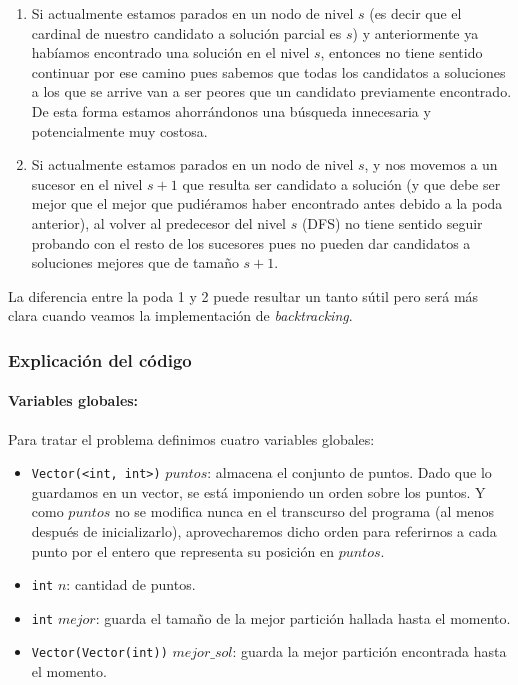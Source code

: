 \begin{enumerate}
  \item Si actualmente estamos parados en un nodo de nivel $s$ (es decir que el cardinal de nuestro candidato a solución parcial es $s$) y anteriormente ya habíamos encontrado una solución en el nivel $s$, entonces no tiene sentido continuar por ese camino pues sabemos que todas los candidatos a soluciones a los que se arrive van a ser peores que un candidato previamente encontrado. De esta forma estamos ahorrándonos una búsqueda innecesaria y potencialmente muy costosa.
  \item Si actualmente estamos parados en un nodo de nivel $s$, y nos movemos a un sucesor en el nivel $s+1$ que resulta ser candidato a solución (y que debe ser mejor que el mejor que pudiéramos haber encontrado antes debido a la poda anterior), al volver al predecesor del nivel $s$ (DFS) no tiene sentido seguir probando con el resto de los sucesores pues no pueden dar candidatos a soluciones mejores que de tamaño $s+1$.
\end{enumerate}

La diferencia entre la poda 1 y 2 puede resultar un tanto sútil pero será más clara cuando veamos la implementación de \textit{backtracking}.

\subsubsection{Explicación del código}
  \paragraph{Variables globales:} Para tratar el problema definimos cuatro variables globales:
  \begin{itemize}
    \item \texttt{Vector(<int, int>)} $puntos$: almacena el conjunto de puntos. Dado que lo guardamos en un vector, se está imponiendo un orden sobre los puntos. Y como $puntos$ no se modifica nunca en el transcurso del programa (al menos después de inicializarlo), aprovecharemos dicho orden para referirnos a cada punto por el entero que representa su posición en $puntos$.
    \item \texttt{int} $n$: cantidad de puntos.
    \item \texttt{int} $mejor$: guarda el tamaño de la mejor partición hallada hasta el momento.
    \item \texttt{Vector(Vector(int))} $mejor\_sol$: guarda la mejor partición encontrada hasta el momento.
  \end{itemize}
